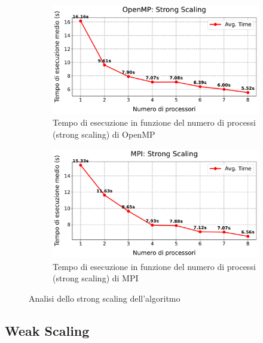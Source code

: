 \documentclass[letterpaper,11pt,leqno]{article}
\begin{document}
\begin{figure}[h]
    \centering
    \begin{subfigure}{0.48\textwidth} %
        \centering
        \includegraphics[scale=0.3]{graphs/omp_strong_scaling.pdf}
        \caption{Tempo di esecuzione in funzione del numero di processi (strong scaling) di OpenMP}
        \label{f:strong_scaling}
    \end{subfigure}
    \hfill %
    \begin{subfigure}{0.48\textwidth} %
        \centering
        \includegraphics[scale=0.3]{graphs/mpi_strong_scaling.pdf}
        \caption{Tempo di esecuzione in funzione del numero di processi (strong scaling) di MPI}
        \label{f:strong_scaling_speedup}
    \end{subfigure}
    \caption{Analisi dello strong scaling dell'algoritmo}
    \label{f:strong_scaling_graphs}
\end{figure}
  


\subsection{Weak Scaling}
\end{document}
